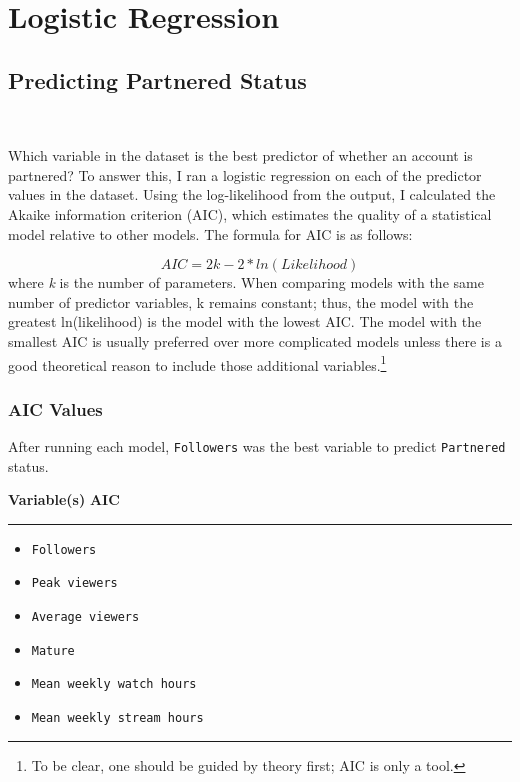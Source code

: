 \documentclass[12pt]{article}
\begin{document}
\section{Logistic Regression}

\subsection{Predicting Partnered Status}\

Which variable in the dataset is the best predictor of whether an account is partnered? To answer this, I ran a logistic regression on each of the predictor values in the dataset. Using the log-likelihood from the output, I calculated the Akaike information criterion (AIC), which estimates the quality of a statistical model relative to other models. The formula for AIC is as follows:

\begin{equation}
AIC = 2k -2 \ast ln(Likelihood)
\end{equation}
where \emph{k} is the number of parameters. When comparing models with the same number of predictor variables, k remains constant; thus, the model with the greatest ln(likelihood) is the model with the lowest AIC. The model with the smallest AIC is usually preferred over more complicated models unless there is a good theoretical reason to include those additional variables.\footnote{To be clear, one should be guided by theory first; AIC is only a tool.}

\subsubsection{AIC Values}

After running each model, \texttt{Followers} was the best variable to predict \texttt{Partnered} status.

\vspace{2mm}
\noindent \textbf{Variable(s)} \hfill \textbf{AIC}
\hspace{0.4em}
\hrule
\begin{itemize}
	\item \texttt{Followers}  
	\item \texttt{Peak viewers} 
	\item \texttt{Average viewers} 
	\item \texttt{Mature} 
	\item \texttt{Mean weekly watch hours} 
	\item \texttt{Mean weekly stream hours} 
\end{itemize}
\end{document}
